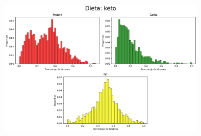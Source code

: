 \documentclass[12pt,a4paper]{article}
\begin{document}
        \begin{center}
            \includegraphics[width=0.75\textwidth]{Resources/2_03_plot_02.png}
        \end{center}
\end{document}
